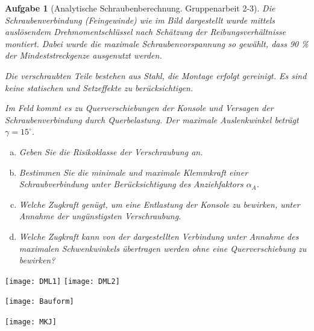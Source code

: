 \documentclass[11pt,a4paper,headsepline]{scrartcl}
\newtheorem{aufgabe}{Aufgabe}
\begin{document}
\begin{aufgabe}[Analytische Schraubenberechnung. Gruppenarbeit 2-3] 

         	
   
Die Schraubenverbindung (Feingewinde) wie im Bild dargestellt wurde mittels ausl\"osendem Drehmomentschl\"ussel nach Sch\"atzung der Reibungsverh\"altnisse montiert. Dabei wurde die maximale Schraubenvorspannung so gew\"ahlt, dass 90 \% der Mindeststreckgenze ausgenutzt werden.

Die verschraubten Teile bestehen aus Stahl, die Montage erfolgt gereinigt. Es sind keine statischen und Setzeffekte zu ber\"ucksichtigen.

Im Feld kommt es zu Querverschiebungen der Konsole und Versagen der Schraubenverbindung durch Querbelastung. Der maximale Auslenkwinkel betr\"agt $\gamma = 15^{\circ}$. 

\begin{enumerate}[a)]
\item Geben Sie die Risikoklasse der Verschraubung an.
\item Bestimmen Sie die minimale und maximale Klemmkraft einer Schraubverbindung unter Ber\"ucksichtigung des Anziehfaktors $\alpha_{A}$.
\item Welche Zugkraft gen\"ugt, um eine Entlastung der Konsole zu bewirken, unter Annahme der ung\"unstigsten Verschraubung. 
\item Welche Zugkraft kann von der dargestellten Verbindung unter Annahme des maximalen Schwenkwinkels \"ubertragen werden ohne eine Querverschiebung zu bewirken?
\end{enumerate}

\end{aufgabe}


\begin{landscape}
\begin{center}
\texttt{[image: DML1]}
\newpage
\texttt{[image: DML2]}
\end{center}
\texttt{[image: Bauform]}
\newpage
\end{landscape}

\texttt{[image: MKJ]}
\end{document}
